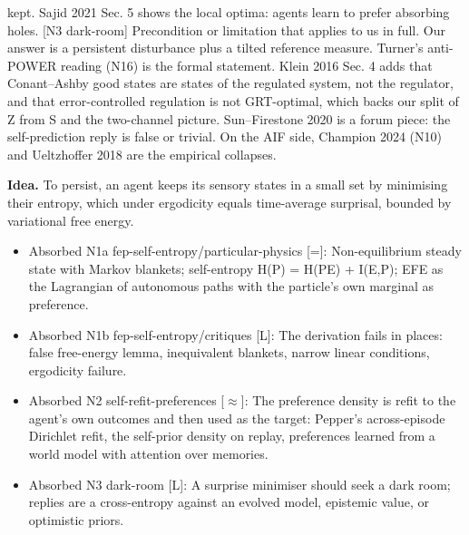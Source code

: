 \documentclass[10pt]{article}
\begin{document}
kept. Sajid 2021 Sec. 5 shows the local optima: agents learn to prefer absorbing holes. [N3 dark-room] Precondition or limitation that applies to us in full. Our answer is a persistent disturbance plus a tilted reference measure. Turner's anti-POWER reading (N16) is the formal statement. Klein 2016 Sec. 4 adds that Conant--Ashby good states are states of the regulated system, not the regulator, and that error-controlled regulation is not GRT-optimal, which backs our split of Z from S and the two-channel picture. Sun--Firestone 2020 is a forum piece: the self-prediction reply is false or trivial. On the AIF side, Champion 2024 (N10) and Ueltzhoffer 2018 are the empirical collapses.

\textbf{Idea.} To persist, an agent keeps its sensory states in a small set by minimising their entropy, which under ergodicity equals time-average surprisal, bounded by variational free energy.
\begin{itemize}[nosep,leftmargin=1.2em]
\item Absorbed N1a fep-self-entropy/particular-physics [=]: Non-equilibrium steady state with Markov blankets; self-entropy H(P) = H(P\textbar{}E) + I(E,P); EFE as the Lagrangian of autonomous paths with the particle's own marginal as preference.
\item Absorbed N1b fep-self-entropy/critiques [L]: The derivation fails in places: false free-energy lemma, inequivalent blankets, narrow linear conditions, ergodicity failure.
\item Absorbed N2 self-refit-preferences [\ensuremath{\approx}]: The preference density is refit to the agent's own outcomes and then used as the target: Pepper's across-episode Dirichlet refit, the self-prior density on replay, preferences learned from a world model with attention over memories.
\item Absorbed N3 dark-room [L]: A surprise minimiser should seek a dark room; replies are a cross-entropy against an evolved model, epistemic value, or optimistic priors.
\end{itemize}
\end{document}

